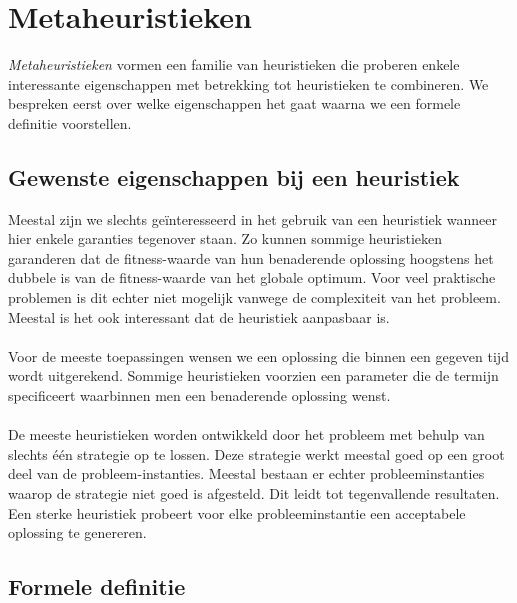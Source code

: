 \section{Metaheuristieken}

\emph{Metaheuristieken}\cite{journals/cor/Glover86} vormen een familie van heuristieken die proberen enkele interessante eigenschappen met betrekking tot heuristieken te combineren. We bespreken eerst over welke eigenschappen het gaat waarna we een formele definitie voorstellen.

\subsection{Gewenste eigenschappen bij een heuristiek}

Meestal zijn we slechts ge\"interesseerd in het gebruik van een heuristiek wanneer hier enkele garanties tegenover staan. Zo kunnen sommige heuristieken garanderen dat de fitness-waarde van hun benaderende oplossing hoogstens het dubbele is van de fitness-waarde van het globale optimum. Voor veel praktische problemen is dit echter niet mogelijk vanwege de complexiteit van het probleem. Meestal is het ook interessant dat de heuristiek aanpasbaar is.

\paragraph{}
Voor de meeste toepassingen wensen we een oplossing die binnen een gegeven tijd wordt uitgerekend. Sommige heuristieken voorzien een parameter die de termijn specificeert waarbinnen men een benaderende oplossing wenst.

\paragraph{}
De meeste heuristieken worden ontwikkeld door het probleem met behulp van slechts \'e\'en strategie op te lossen. Deze strategie werkt meestal goed op een groot deel van de probleem-instanties. Meestal bestaan er echter probleeminstanties waarop de strategie niet goed is afgesteld. Dit leidt tot tegenvallende resultaten. Een sterke heuristiek probeert voor elke probleeminstantie een acceptabele oplossing te genereren.

\subsection{Formele definitie}

